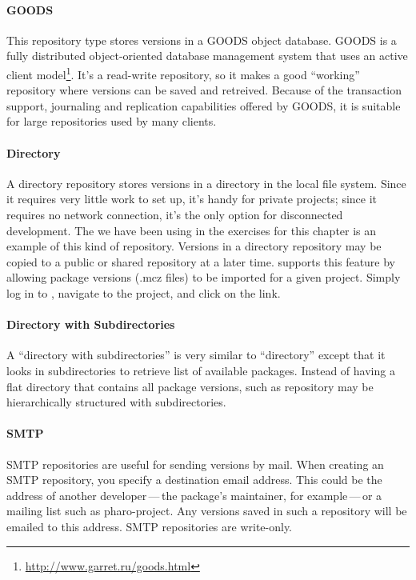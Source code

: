 \documentclass[a4paper,10pt,twoside]{book}
\begin{document}
\paragraph{GOODS}
This repository type stores versions in a GOODS object database.
GOODS is a fully distributed object-oriented database management system that uses an active client model\footnote{\url{http://www.garret.ru/goods.html}}.
It's a read-write repository, so it makes a good ``working'' repository where versions can be saved and retreived. Because of the transaction support, journaling and replication capabilities offered by GOODS, it is suitable for large repositories used by many clients.  

\paragraph{Directory} A directory repository stores versions in a directory in the local file system. Since it requires very little work to set up, it's handy for private projects; since it requires no network connection, it's the only option for disconnected development. The  we have been using in the exercises for this chapter is an example of this kind of repository. Versions in a directory repository may be copied to a public or shared repository at a later time. \sqsrc supports this feature by allowing package versions (.mcz files) to be imported for a given project. Simply log in to \sqsrc, navigate to the project, and click on the  link.

\paragraph{Directory with Subdirectories}  A ``directory with subdirectories'' is very similar to ``directory'' except that it looks in subdirectories to retrieve list of available packages. Instead of having a flat directory that contains all package versions, such as repository may be hierarchically  structured with  subdirectories.

\paragraph{SMTP} SMTP repositories are useful for sending versions by mail. When creating an SMTP repository, you specify a destination email address. This could be the address of another developer\,---\,the package's maintainer, for example\,---\,or a mailing list such as pharo-project. Any versions saved in such a repository will be emailed to this address.  SMTP repositories are write-only.
\end{document}
